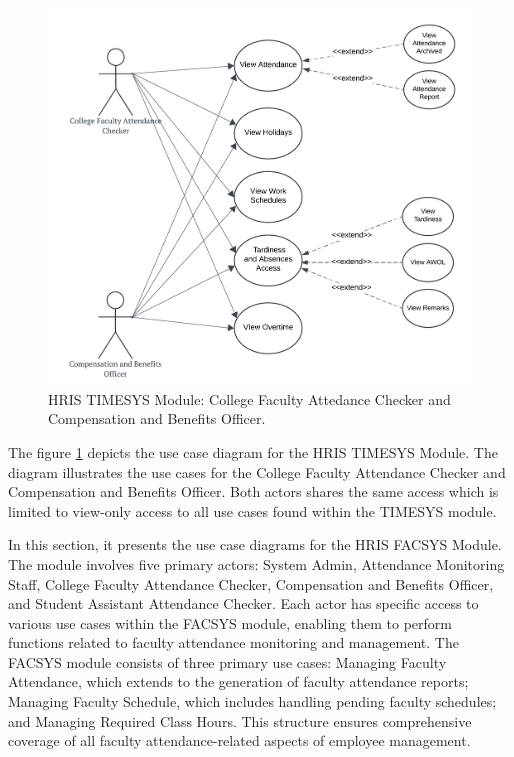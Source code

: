     \begin{figure}[H]
        \centering
        \includegraphics[width=0.9\linewidth]{figures/images/use-case-time-2.png}
        \caption{HRIS TIMESYS Module: College Faculty Attedance Checker and Compensation and Benefits Officer.}
        \label{fig:use-case-time-2}
    \end{figure}

    The figure \ref{fig:use-case-time-2} depicts the use case diagram for the HRIS TIMESYS Module. The diagram illustrates the use cases for the College Faculty Attendance Checker and Compensation and Benefits Officer. Both actors shares the same access which is limited to view-only access to all use cases found within the TIMESYS module. 


    In this section, it presents the use case diagrams for the HRIS FACSYS Module. The module involves five primary actors: System Admin, Attendance Monitoring Staff, College Faculty Attendance Checker, Compensation and Benefits Officer, and Student Assistant Attendance Checker. Each actor has specific access to various use cases within the FACSYS module, enabling them to perform functions related to faculty attendance monitoring and management. The FACSYS module consists of three primary use cases: Managing Faculty Attendance, which extends to the generation of faculty attendance reports; Managing Faculty Schedule, which includes handling pending faculty schedules; and Managing Required Class Hours. This structure ensures comprehensive coverage of all faculty attendance-related aspects of employee management.

